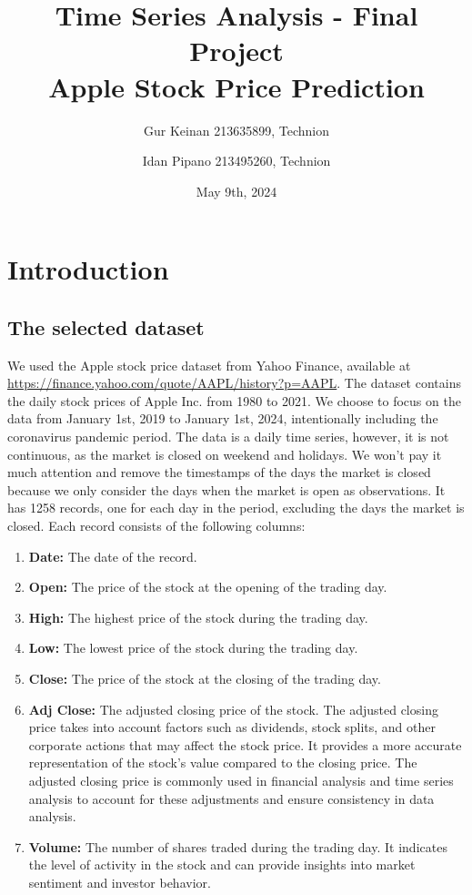 \documentclass[12pt]{article}
\title{Time Series Analysis - Final Project \\ \Large Apple Stock Price Prediction}
\author{Gur Keinan 213635899, Technion \and Idan Pipano 213495260, Technion}
\date{May 9th, 2024}
\theoremstyle{definition}
\begin{document}
\pagestyle{empty} %
\maketitle
\thispagestyle{empty} %

\tableofcontents

\newpage  

\setcounter{page}{1} %
\pagestyle{plain} %

\section{Introduction}

\subsection{The selected dataset}
We used the Apple stock price dataset from Yahoo Finance, available at \url{https://finance.yahoo.com/quote/AAPL/history?p=AAPL}.
The dataset contains the daily stock prices of Apple Inc. from 1980 to 2021.  
We choose to focus on the data from January 1st, 2019 to January 1st, 2024, intentionally including the coronavirus pandemic period. 
The data is a daily time series, however, it is not continuous, as the market is closed on weekend and holidays. We won't pay it much attention and remove the timestamps of the days the market is closed because we only consider the days when the market is open as observations.
It has 1258 records, one for each day in the period, excluding the days the market is closed.
Each record consists of the following columns: 
\begin{enumerate}
  \item \textbf{Date:} The date of the record.
  \item \textbf{Open:} The price of the stock at the opening of the trading day.
  \item \textbf{High:} The highest price of the stock during the trading day.
  \item \textbf{Low:} The lowest price of the stock during the trading day.
  \item \textbf{Close:} The price of the stock at the closing of the trading day.
  \item \textbf{Adj Close:} The adjusted closing price of the stock. The adjusted closing price takes into account factors such as dividends, stock splits, and other corporate actions that may affect the stock price. It provides a more accurate representation of the stock's value compared to the closing price. The adjusted closing price is commonly used in financial analysis and time series analysis to account for these adjustments and ensure consistency in data analysis.
  \item \textbf{Volume:} The number of shares traded during the trading day. It indicates the level of activity in the stock and can provide insights into market sentiment and investor behavior.
\end{enumerate}
\end{document}
